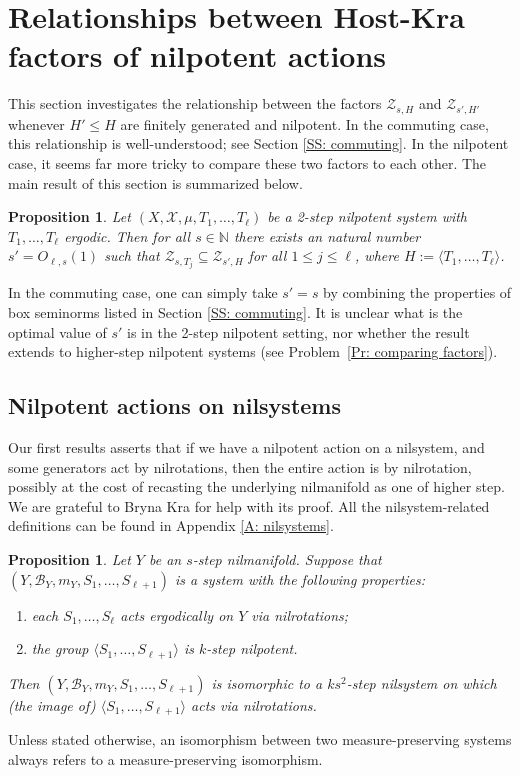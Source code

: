 \documentclass[11pt]{amsart}
\newtheorem{proposition}[lemma]{Proposition}
\theoremstyle{definition}
\newcommand{\N}{{\mathbb N}}
\newcommand{\CB}{{\mathcal B}}
\newcommand{\CX}{{\mathcal X}}
\newcommand{\CZ}{{\mathcal Z}}
\newcommand{\1}{{\mathbf{1}}}
\begin{document}
\section{Relationships between Host-Kra factors of nilpotent actions}\label{S: comparison of factors}
This section investigates the relationship between the factors $\CZ_{s,H}$ and $\CZ_{s',H'}$ whenever $H'\leq H$ are finitely generated and nilpotent. In the commuting case, this relationship is well-understood; see Section \ref{SS: commuting}. In the nilpotent case, it seems far more tricky to compare these two factors to each other. The main result of this section is summarized below.
\begin{proposition}\label{P: comparing HK factors in nilpotent systems}
Let $(X, \CX, \mu, T_1, \ldots, T_\ell)$ be a 2-step nilpotent system with $T_1, \ldots, T_{\ell}$ ergodic. Then for all $s\in\N$ there exists an natural number $s'=O_{\ell,s}(1)$ such that
  $\CZ_{s,T_j}\subseteq\CZ_{s',H}$ for all $1\leq j\leq \ell$, where $H := \langle T_1, \ldots, T_\ell\rangle$.
\end{proposition}
In the commuting case, one can simply take $s'=s$ by combining the properties of box seminorms listed in Section \ref{SS: commuting}. It is unclear what is the optimal value of $s'$ is in the 2-step nilpotent setting, nor whether the result extends to higher-step nilpotent systems (see Problem~\ref{Pr: comparing factors}). 

\subsection{Nilpotent actions on nilsystems}
Our first results asserts that if we have a nilpotent action on a nilsystem, and some generators act by nilrotations, then the entire action is by nilrotation, possibly at the cost of recasting the underlying nilmanifold as one of higher step. We are grateful to Bryna Kra for help with its proof. All the nilsystem-related definitions can be found in Appendix \ref{A: nilsystems}.
\begin{proposition}\label{P: Bryna}
Let $Y$ be an $s$-step nilmanifold. Suppose that $(Y, \CB_Y, m_Y, S_1, \ldots, S_{\ell+1})$ is a system with the following properties:
\begin{enumerate}
    \item each $S_1, \ldots, S_\ell$ acts ergodically on $Y$ via nilrotations;
    \item the group $\langle S_1, \ldots, S_{\ell+1}\rangle$ is $k$-step nilpotent.
\end{enumerate}
Then $(Y, \CB_Y, m_Y, S_1, \ldots, S_{\ell+1})$ is isomorphic to a $ks^2$-step nilsystem on which (the image of) $\langle S_1, \ldots, S_{\ell+1}\rangle$ acts via nilrotations.
\end{proposition}
Unless stated otherwise, an isomorphism between two measure-preserving systems always refers to a measure-preserving isomorphism.
\end{document}
